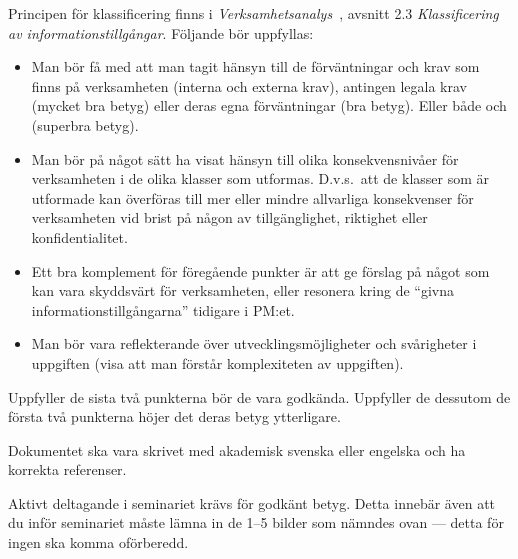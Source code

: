 \documentclass[a4paper]{llncs}
\begin{document}
\begin{enumerate}
\begin{solution}
      Principen för klassificering finns 
      i \emph{Verksamhetsanalys}~\cite{MSB2011v}, avsnitt 2.3 
      \emph{Klassificering av informationstillgångar}.
      Följande bör uppfyllas:
      \begin{itemize}
        \item Man bör få med att man tagit hänsyn till de förväntningar och krav 
          som finns på verksamheten (interna och externa krav), antingen legala 
          krav (mycket bra betyg) eller deras egna förväntningar (bra betyg).
          Eller både och (superbra betyg).
        \item Man bör på något sätt ha visat hänsyn till olika konsekvensnivåer 
          för verksamheten i de olika klasser som utformas.
          D.v.s.\ att de klasser som är utformade kan överföras till mer eller 
          mindre allvarliga konsekvenser för verksamheten vid brist på någon av 
          tillgänglighet, riktighet eller konfidentialitet.
        \item Ett bra komplement för föregående punkter är att ge förslag på 
          något som kan vara skyddsvärt för verksamheten, eller resonera kring de 
          \enquote{givna informationstillgångarna} tidigare i PM:et.
        \item Man bör vara reflekterande över utvecklingsmöjligheter och 
          svårigheter i uppgiften (visa att man förstår komplexiteten av 
          uppgiften).
      \end{itemize}
      Uppfyller de sista två punkterna bör de vara godkända.
      Uppfyller de dessutom de första två punkterna höjer det deras betyg 
      ytterligare.
    \end{solution}
\end{enumerate}

Dokumentet ska vara skrivet med akademisk svenska eller engelska och ha 
korrekta referenser.

Aktivt deltagande i seminariet krävs för godkänt betyg.
Detta innebär även att du inför seminariet måste lämna in de 1--5 bilder som 
nämndes ovan --- detta för ingen ska komma oförberedd.


\printbibliography{}
\end{document}

